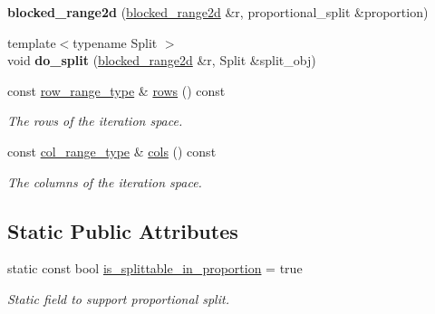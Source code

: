 \begin{DoxyCompactItemize}
\item 
\hypertarget{classtbb_1_1blocked__range2d_a9ebbf0fa580c0553ec2e3c5997b9799c}{}{\bfseries blocked\+\_\+range2d} (\hyperlink{classtbb_1_1blocked__range2d}{blocked\+\_\+range2d} \&r, proportional\+\_\+split \&proportion)\label{classtbb_1_1blocked__range2d_a9ebbf0fa580c0553ec2e3c5997b9799c}

\item 
\hypertarget{classtbb_1_1blocked__range2d_a06ae436bae2c8be5a95212ea410791db}{}{\footnotesize template$<$typename Split $>$ }\\void {\bfseries do\+\_\+split} (\hyperlink{classtbb_1_1blocked__range2d}{blocked\+\_\+range2d} \&r, Split \&split\+\_\+obj)\label{classtbb_1_1blocked__range2d_a06ae436bae2c8be5a95212ea410791db}

\item 
\hypertarget{classtbb_1_1blocked__range2d_a4f7299e74c40df57dee2433c07ce65ae}{}const \hyperlink{classtbb_1_1blocked__range2d_ada609b296a9af0591cc34761b8538100}{row\+\_\+range\+\_\+type} \& \hyperlink{classtbb_1_1blocked__range2d_a4f7299e74c40df57dee2433c07ce65ae}{rows} () const \label{classtbb_1_1blocked__range2d_a4f7299e74c40df57dee2433c07ce65ae}

\begin{DoxyCompactList}\small\item\em The rows of the iteration space. \end{DoxyCompactList}\item 
\hypertarget{classtbb_1_1blocked__range2d_af3bccfaf90126b285491096f78ca9473}{}const \hyperlink{classtbb_1_1blocked__range}{col\+\_\+range\+\_\+type} \& \hyperlink{classtbb_1_1blocked__range2d_af3bccfaf90126b285491096f78ca9473}{cols} () const \label{classtbb_1_1blocked__range2d_af3bccfaf90126b285491096f78ca9473}

\begin{DoxyCompactList}\small\item\em The columns of the iteration space. \end{DoxyCompactList}\end{DoxyCompactItemize}
\subsection*{Static Public Attributes}
\begin{DoxyCompactItemize}
\item 
\hypertarget{classtbb_1_1blocked__range2d_aa0519760654368000f7ebc87d9bfe898}{}static const bool \hyperlink{classtbb_1_1blocked__range2d_aa0519760654368000f7ebc87d9bfe898}{is\+\_\+splittable\+\_\+in\+\_\+proportion} = true\label{classtbb_1_1blocked__range2d_aa0519760654368000f7ebc87d9bfe898}

\begin{DoxyCompactList}\small\item\em Static field to support proportional split. \end{DoxyCompactList}\end{DoxyCompactItemize}


